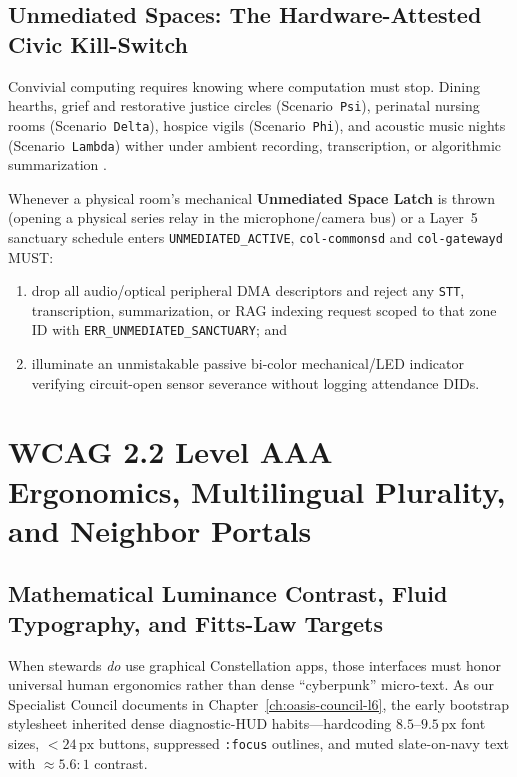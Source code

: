 \subsection{Unmediated Spaces: The Hardware-Attested Civic Kill-Switch}

Convivial computing requires knowing where computation must stop. Dining hearths, grief and restorative justice circles (Scenario~\texttt{Psi}), perinatal nursing rooms (Scenario~\texttt{Delta}), hospice vigils (Scenario~\texttt{Phi}), and acoustic music nights (Scenario~\texttt{Lambda}) wither under ambient recording, transcription, or algorithmic summarization \parencite{zuboff2019}.

\begin{invariant}
\label{inv:unmediated-spaces}
Whenever a physical room's mechanical \textbf{Unmediated Space Latch} is thrown (opening a physical series relay in the microphone/camera bus) or a Layer~5 sanctuary schedule enters \texttt{UNMEDIATED\_ACTIVE}, \texttt{col-commonsd} and \texttt{col-gatewayd} MUST:
\begin{enumerate}
    \item drop all audio/optical peripheral DMA descriptors and reject any \texttt{STT}, transcription, summarization, or RAG indexing request scoped to that zone ID with \texttt{ERR\_UNMEDIATED\_SANCTUARY}; and
    \item illuminate an unmistakable passive bi-color mechanical/LED indicator verifying circuit-open sensor severance without logging attendance DIDs.
\end{enumerate}
\end{invariant}

\section{WCAG 2.2 Level AAA Ergonomics, Multilingual Plurality, and Neighbor Portals}
\label{sec:wcag-aaa}

\subsection{Mathematical Luminance Contrast, Fluid Typography, and Fitts-Law Targets}

When stewards \textit{do} use graphical Constellation apps, those interfaces must honor universal human ergonomics rather than dense ``cyberpunk'' micro-text. As our Specialist Council documents in Chapter~\ref{ch:oasis-council-l6}, the early bootstrap stylesheet inherited dense diagnostic-HUD habits---hardcoding $8.5\text{--}9.5\,\mathrm{px}$ font sizes, $< 24\,\mathrm{px}$ buttons, suppressed \texttt{:focus} outlines, and muted slate-on-navy text with $\approx 5.6:1$ contrast.

